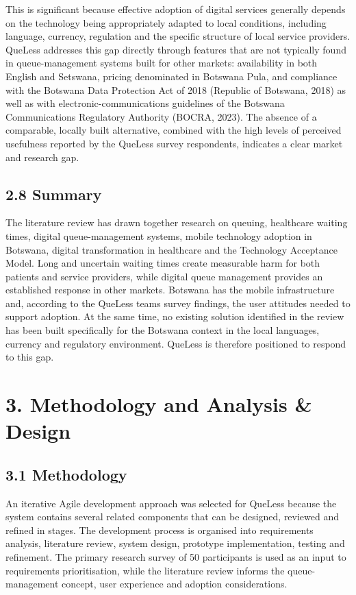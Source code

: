 \documentclass[
]{article}
\begin{document}
This is significant because effective adoption of digital services
generally depends on the technology being appropriately adapted to local
conditions, including language, currency, regulation and the specific
structure of local service providers. QueLess addresses this gap
directly through features that are not typically found in
queue-management systems built for other markets: availability in both
English and Setswana, pricing denominated in Botswana Pula, and
compliance with the Botswana Data Protection Act of 2018 (Republic of
Botswana, 2018) as well as with electronic-communications guidelines of
the Botswana Communications Regulatory Authority (BOCRA, 2023). The
absence of a comparable, locally built alternative, combined with the
high levels of perceived usefulness reported by the QueLess survey
respondents, indicates a clear market and research gap.

\subsection{2.8 Summary}\label{summary}

The literature review has drawn together research on queuing, healthcare
waiting times, digital queue-management systems, mobile technology
adoption in Botswana, digital transformation in healthcare and the
Technology Acceptance Model. Long and uncertain waiting times create
measurable harm for both patients and service providers, while digital
queue management provides an established response in other markets.
Botswana has the mobile infrastructure and, according to the QueLess
team\textquotesingle s survey findings, the user attitudes needed to
support adoption. At the same time, no existing solution identified in
the review has been built specifically for the Botswana context in the
local languages, currency and regulatory environment. QueLess is
therefore positioned to respond to this gap.

\section{3. Methodology and Analysis \&
Design}\label{methodology-and-analysis-design}

\subsection{3.1 Methodology}\label{methodology}

An iterative Agile development approach was selected for QueLess because
the system contains several related components that can be designed,
reviewed and refined in stages. The development process is organised
into requirements analysis, literature review, system design, prototype
implementation, testing and refinement. The primary research survey of
50 participants is used as an input to requirements prioritisation,
while the literature review informs the queue-management concept, user
experience and adoption considerations.
\end{document}
